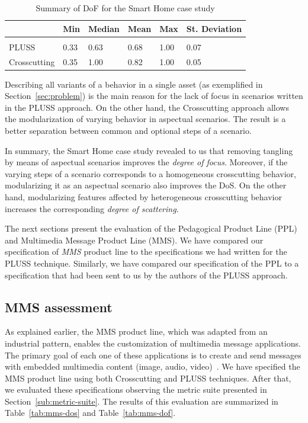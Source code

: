 \documentclass{acm_proc_article-sp}
\begin{document}
\begin{table}[htb] \centering
\caption{Summary of DoF for the Smart Home case study}
\label{tab:sh-dof}
\begin{small}
\begin{tabular}{llllll} \hline
					& Min 	& Median 	& Mean 	& Max 	& St. Deviation \\ \hline \\
	PLUSS			& 0.33  & 0.63   	& 0.68  & 1.00 	& 0.07 			\\
	Crosscutting	& 0.35  & 1.00   	& 0.82 	& 1.00 	& 0.05			\\ \hline	
\end{tabular}
\end{small}
\end{table}

Describing all variants of a behavior in a single asset
(as exemplified in Section~\ref{sec:problem}) is the main reason for the lack of
focus in scenarios written in the PLUSS approach. On the other hand, the Crosscutting approach
allows the modularization of varying behavior in aspectual scenarios. The result
is a better separation between common and optional steps of a scenario.

In summary, the Smart Home case study revealed to us that removing tangling by
means of aspectual scenarios improves the \emph{degree of focus}. Moreover, if
the varying steps of a scenario corresponds to a homogeneous crosscutting
behavior, modularizing it as an aspectual scenario also improves the DoS. On the
other hand, modularizing features affected by heterogeneous crosscutting
behavior increases the corresponding \emph{degree of scattering}.

The next sections present the evaluation of the Pedagogical Product Line (PPL)
and Multimedia Message Product Line (MMS). We have compared our specification of
\emph{MMS} product line to the specifications we had written for the
PLUSS technique. Similarly, we have compared our specification
of the PPL to a specification that had been sent to us by
the authors of the PLUSS approach.

\subsection{MMS assessment}

As explained earlier, the MMS product line, which was adapted from an industrial
pattern, enables the customization of multimedia message applications. The
primary goal of each one of these applications is to create and send messages
with embedded multimedia content (image, audio, video)~\cite{Bonifacio:2008aa}.
We have specified the MMS product line using both Crosscutting and PLUSS
techniques. After that, we evaluated these specifications observing the metric
suite presented in Section~\ref{sub:metric-suite}. The results of this evaluation are
summarized in Table~\ref{tab:mms-dos} and Table~\ref{tab:mms-dof}.
\end{document}

